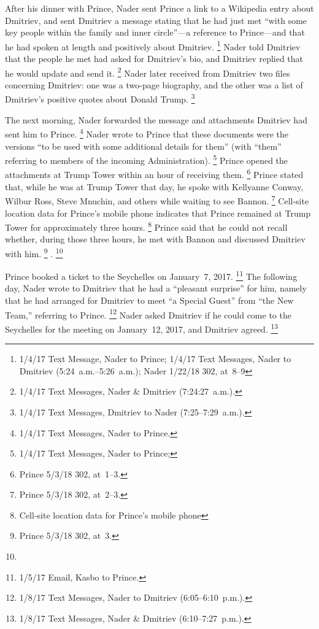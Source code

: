 After his dinner with Prince, Nader sent Prince a link to a Wikipedia entry about Dmitriev, and sent Dmitriev a message stating that he had just met ``with some key people within the family and inner circle''---a reference to Prince---and that he had spoken at length and positively about Dmitriev.%
\footnote{1/4/17 Text Message, Nader to Prince;
1/4/17 Text Messages, Nader to Dmitriev (5:24~a.m.--5:26~a.m.);
Nader 1/22/18 302, at~8--9
}
Nader told Dmitriev that the people he met had asked for Dmitriev's bio, and Dmitriev replied that he would update and send it.%
\footnote{1/4/17 Text Messages, Nader \& Dmitriev (7:24:27~a.m.).}
Nader later received from Dmitriev two files concerning Dmitriev: one was a two-page biography, and the other was a list of Dmitriev's positive quotes about Donald Trump.%
\footnote{1/4/17 Text Messages, Dmitriev to Nader (7:25--7:29~a.m.).}

The next morning, Nader forwarded the message and attachments Dmitriev had sent him to Prince.%
\footnote{1/4/17 Text Messages, Nader to Prince.}
Nader wrote to Prince that these documents were the versions ``to be used with some additional details for them'' (with ``them'' referring to members of the incoming Administration).%
\footnote{1/4/17 Text Messages, Nader to Prince; }
Prince opened the attachments at Trump Tower within an hour of receiving them.%
\footnote{Prince 5/3/18 302, at~1--3.}
Prince stated that, while he was at Trump Tower that day, he spoke with Kellyanne Conway, Wilbur Ross, Steve Mnuchin, and others while waiting to see Bannon.%
\footnote{Prince 5/3/18 302, at~2--3.}
Cell-site location data for Prince's mobile phone indicates that Prince remained at Trump Tower for approximately three hours.%
\footnote{Cell-site location data for Prince's mobile phone }
Prince said that he could not recall whether, during those three hours, he met with Bannon and discussed Dmitriev with him.%
\footnote{Prince 5/3/18 302, at~3.}
.%
\footnote{}

Prince booked a ticket to the Seychelles on January~7, 2017.%
\footnote{1/5/17 Email, Kasbo to Prince.}
The following day, Nader wrote to Dmitriev that he had a ``pleasant surprise'' for him, namely that he had arranged for Dmitriev to meet ``a Special Guest'' from ``the New Team,'' referring to Prince.%
\footnote{1/8/17 Text Messages, Nader to Dmitriev (6:05--6:10~p.m.).}
Nader asked Dmitriev if he could come to the Seychelles for the meeting on January~12, 2017, and Dmitriev agreed.%
\footnote{1/8/17 Text Messages, Nader \& Dmitriev (6:10--7:27~p.m.).}

